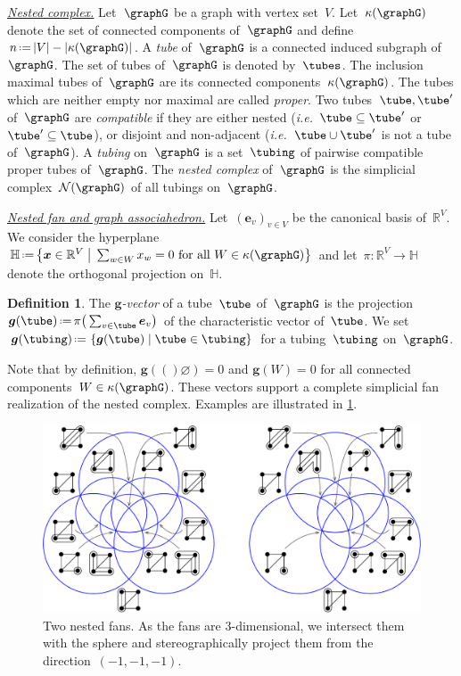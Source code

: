\documentclass{amsart}
\theoremstyle{definition}
\newtheorem{definition}[theorem]{Definition}
\newcommand{\R}{\mathbb{R}} %
\newcommand{\HH}{\mathbb{H}} %
\renewcommand{\b}[1]{{\boldsymbol{#1}}} %
\newcommand{\set}[2]{\left\{ #1 \;\middle|\; #2 \right\}} %
\newcommand{\bigset}[2]{\big\{ #1 \;\big|\; #2 \big\}} %
\newcommand{\eqdef}{\mbox{\,\raisebox{0.2ex}{\scriptsize\ensuremath{\mathrm:}}\ensuremath{=}\,}} %
\newcommand{\ie}{\textit{i.e.}~} %
\newcommand{\darkblue}{\color{darkblue}} %
\newcommand{\defn}[1]{\textsl{\darkblue #1}} %
\newcommand{\para}[1]{\medskip\noindent\uline{\textit{#1.}}} %
\newcommand{\gvector}[1]{\b{g}(#1)} %
\newcommand{\gvectors}[1]{\b{g}(#1)} %
\newcommand{\ground}{V} %
\newcommand{\connectedComponents}{\kappa} %
\newcommand{\nestedComplex}{\mathcal{N}} %
\begin{document}
\para{Nested complex}
%
Let~$\graphG$ be a graph with vertex set~$\ground$.
Let~$\connectedComponents(\graphG)$ denote the set of connected components of~$\graphG$ and define~$n \eqdef |\ground|-|\connectedComponents(\graphG)|$.
A \defn{tube} of~$\graphG$ is a connected induced subgraph of~$\graphG$.
The set of tubes of~$\graphG$ is denoted by~$\tubes$.
The inclusion maximal tubes of~$\graphG$ are its connected components~$\connectedComponents(\graphG)$.
The tubes which are neither empty nor maximal are called \defn{proper}.
Two tubes~$\tube, \tube'$ of~$\graphG$ are \defn{compatible} if they are either nested (\ie $\tube \subseteq \tube'$ or~$\tube' \subseteq \tube$), or disjoint and non-adjacent (\ie $\tube \cup \tube'$ is not a tube of~$\graphG$).
A \defn{tubing} on~$\graphG$ is a set~$\tubing$ of pairwise compatible proper tubes of~$\graphG$.
The \defn{nested complex} of~$\graphG$ is the simplicial complex~$\nestedComplex(\graphG)$ of all tubings on~$\graphG$.

\para{Nested fan and graph associahedron}
%
Let~$(\b{e}_v)_{v \in \ground}$ be the canonical basis of~$\R^\ground$.
We consider the hyperplane~${\HH \eqdef \bigset{\b{x} \in \R^\ground}{\sum_{w \in W} x_w = 0 \text{ for all } W \in \connectedComponents(\graphG)}}$ and let~$\pi : \R^\ground \to \HH$ denote the orthogonal projection on~$\HH$.

\begin{definition}
The \defn{$\b{g}$-vector} of a tube~$\tube$ of~$\graphG$ is the projection~$\gvector{\tube} \eqdef \pi \big( \sum_{v \in \tube} \b{e}_v \big)$ of the characteristic vector of~$\tube$.
We set~$\gvectors{\tubing} \eqdef \set{\gvector{\tube}}{\tube \in \tubing}$ for a tubing~$\tubing$ on~$\graphG$.
\end{definition}

Note that by definition, $\gvector(\varnothing) = 0$ and $\gvector{W} = 0$ for all connected components~$W \in \connectedComponents(\graphG)$.
These vectors support a complete simplicial fan realization of the nested complex.
Examples are illustrated in \cref{fig:nestedFans}.

\begin{figure}[b]
	\capstart
	\centerline{\includegraphics[scale=.55]{nestedFans}}
	\caption{Two nested fans. As the fans are $3$-dimensional, we intersect them with the sphere and stereographically project them from the direction~$(-1,-1,-1)$.}
	\label{fig:nestedFans}
\end{figure}
\end{document}
